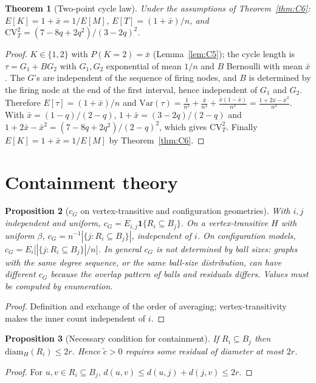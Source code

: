 \documentclass[pdflatex,sn-mathphys-num]{sn-jnl}
\theoremstyle{thmstyleone}%
\newtheorem{theorem}{Theorem}[section]
\newtheorem{proposition}[theorem]{Proposition}
\theoremstyle{thmstylethree}%
\theoremstyle{thmstyletwo}%
\newcommand{\ctil}{\tilde{c}}
\newcommand{\cG}{c_G}
\begin{document}
\begin{theorem}[Two-point cycle law]
\label{thm:C8}
Under the assumptions of Theorem~\ref{thm:C6}: $E[K]=1+\bar x=1/E[M]$,
$E[T]=(1+\bar x)/n$, and
$\mathrm{CV}_T^2=(7-8q+2q^2)/(3-2q)^2$.
\end{theorem}
\begin{proof}
$K\in\{1,2\}$ with $P(K=2)=\bar x$ (Lemma~\ref{lem:C5}); the cycle length
is $\tau=G_1+BG_2$ with $G_1,G_2$ exponential of mean $1/n$ and $B$
Bernoulli with mean $\bar x$. The $G$'s are independent of the sequence
of firing nodes, and $B$ is determined by the firing node at the end of
the first interval, hence independent of $G_1$ and $G_2$. Therefore
$E[\tau]=(1+\bar x)/n$ and
$\mathrm{Var}(\tau)=\frac1{n^2}+\frac{\bar x}{n^2}+\frac{\bar x(1-\bar
x)}{n^2}=\frac{1+2\bar x-\bar x^2}{n^2}$. With $\bar x=(1-q)/(2-q)$,
$1+\bar x=(3-2q)/(2-q)$ and $1+2\bar x-\bar x^2=(7-8q+2q^2)/(2-q)^2$,
which gives $\mathrm{CV}_T^2$. Finally $E[K]=1+\bar x=1/E[M]$ by
Theorem~\ref{thm:C6}.
\end{proof}

\section{Containment theory}
\label{sec:D}

\begin{proposition}[$\cG$ on vertex-transitive and configuration geometries]
\label{prop:D1}
With $i,j$ independent and uniform, $\cG=E_{i,j}\mathbf 1\{R_i\subseteq
B_j\}$. On a vertex-transitive $H$ with uniform $\beta$,
$\cG=n^{-1}|\{j:R_i\subseteq B_j\}|$, independent of $i$. On
configuration models, $\cG=E_i\big[|\{j:R_i\subseteq B_j\}|/n\big]$. In
general $\cG$ is not determined by ball sizes: graphs with the same degree
sequence, or the same ball-size distribution, can have different $\cG$
because the overlap pattern of balls and residuals differs. Values must be
computed by enumeration.
\end{proposition}
\begin{proof}
Definition and exchange of the order of averaging; vertex-transitivity
makes the inner count independent of $i$.
\end{proof}

\begin{proposition}[Necessary condition for containment]
\label{prop:D2}
If $R_i\subseteq B_j$ then $\mathrm{diam}_H(R_i)\le2r$. Hence $\ctil>0$
requires some residual of diameter at most $2r$.
\end{proposition}
\begin{proof}
For $u,v\in R_i\subseteq B_j$, $d(u,v)\le d(u,j)+d(j,v)\le2r$.
\end{proof}
\end{document}
